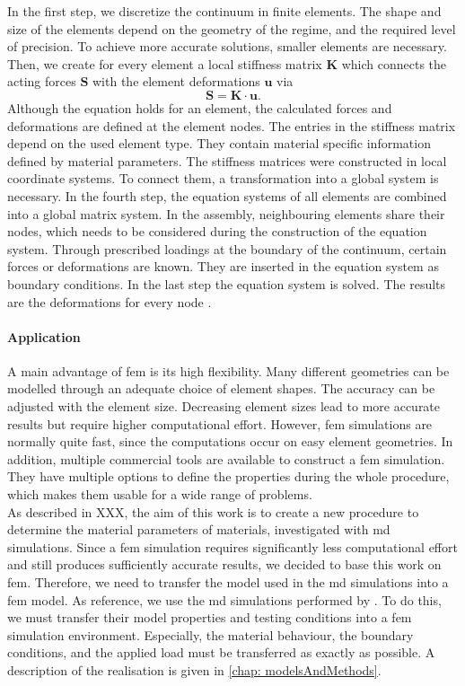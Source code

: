 In the first step, we discretize the continuum in finite elements. The shape and size of the elements depend on the geometry of the regime, and the required level of precision. To achieve more accurate solutions, smaller elements are necessary. Then, we create for every element a local stiffness matrix $\boldsymbol{K}$ which connects the acting forces $\boldsymbol{S}$ with the element deformations $\boldsymbol{u}$ via 
\begin{equation}
    \boldsymbol{S} =  \boldsymbol{K} \cdot \boldsymbol{u}.
\end{equation}
Although the equation holds for an element, the calculated forces and deformations are defined at the element nodes. The entries in the stiffness matrix depend on the used element type. They contain material specific information defined by material parameters. The stiffness matrices were constructed in local coordinate systems. To connect them, a transformation into a global system is necessary. In the fourth step, the equation systems of all elements are combined into a global matrix system. In the assembly, neighbouring elements share their nodes, which needs to be considered during the construction of the equation system. Through prescribed loadings at the boundary of the continuum, certain forces or deformations are known. They are inserted in the equation system as boundary conditions. In the last step the equation system is solved. The results are the deformations for every node \cite{willner_vorlesungsskript_nodate}\cite{jagota_finite_nodate}. 

\paragraph{Application}
A main advantage of \acrshort{fem} is its high flexibility. Many different geometries can be modelled through an adequate choice of element shapes. The accuracy can be adjusted with the element size. Decreasing element sizes lead to more accurate results but require higher computational effort. However, \acrshort{fem} simulations are normally quite fast, since the computations occur on easy element geometries. In addition, multiple commercial tools are available to construct a \acrshort{fem} simulation. They have multiple options to define the properties during the whole procedure, which makes them usable for a wide range of problems. \\
As described in XXX, the aim of this work is to create a new procedure to determine the material parameters of materials, investigated with \acrshort{md} simulations. Since a \acrshort{fem} simulation requires significantly less computational effort and still produces sufficiently accurate results, we decided to base this work on \acrshort{fem}. Therefore, we need to transfer the model used in the \acrshort{md} simulations into a \acrshort{fem} model. As reference, we use the \acrshort{md} simulations performed by \citet{ries_deciphering_nodate}. To do this, we must transfer their model properties and testing conditions into a \acrshort{fem} simulation environment. Especially, the material behaviour, the boundary conditions, and the applied load must be transferred as exactly as possible. A description of the realisation is given in \autoref{chap: modelsAndMethods}. 


